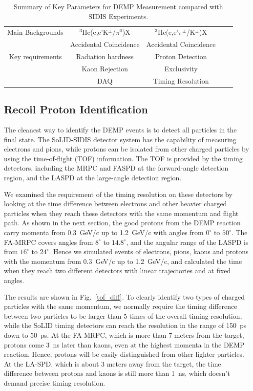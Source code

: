 \begin{table}
\begin{tabular}{|c|c|c|c|c|}
Main Backgrounds           & $\mathrm{^{3}He}$(e,e'K$^\pm$/$\pi^{0}$)X            &$\mathrm{^{3}He}$(e,e'$\pi^{\pm}$/K$^\pm$)X  \\
                           &   Accidental Coincidence & Accidental Coincidence	\\\hline
Key requirements           &  Radiation hardness      & Proton Detection	\\
                           &  Kaon Rejection          & Exclusivity	\\
                           &  DAQ                     &    Timing Resolution   \\
                        \hline
\end{tabular}
\caption{\footnotesize{Summary of Key Parameters for DEMP Measurement compared
    with SIDIS Experiments.}}\label{table:program_summary}
\label{table:key_par_sidis_dvcs}
\end{table} 

\subsection{Recoil Proton Identification}
The cleanest way to identify the DEMP events is to detect all particles in the
final state. The SoLID-SIDIS detector system has the capability of measuring
electrons and pions, while protons can be isolated from other charged particles
by using the time-of-flight (TOF) information. The TOF is provided by the timing
detectors, including the MRPC and FASPD at the forward-angle detection region,
and the LASPD at the large-angle detection region. 

We examined the requirement of the timing resolution on these detectors by
looking at the time difference between electrons and other heavier charged
particles when they reach these detectors with the same momentum and flight
path. As shown in the next section, the good protons from the DEMP reaction
carry momenta from 0.3~GeV/c up to 1.2~GeV/c with angles from
$0^{\circ}$ to $50^{\circ}$. The FA-MRPC covers angles from
$8^{\circ}$ to $14.8^{\circ}$, and the angular range of the LASPD is from
$16^{\circ}$ to $24^{\circ}$.  Hence we simulated
events of electrons, pions, kaons and protons with the momentum from
0.3~GeV/c up to 1.2~GeV/c, and calculated the time when they reach two different
detectors with linear trajectories and at fixed angles.

The results are shown in Fig.~\ref{tof_diff}. To clearly identify two types of
charged particles with the same momentum, we normally require the timing
difference between two particles to be larger than 5 times of the overall
timing resolution, while the SoLID timing detectors can reach the resolution
in the range of 150~ps down to 50~ps.  At the FA-MRPC, which is more than 7
meters from the target, protons come 3~ns later than kaons, even at the
highest momenta in the DEMP reaction. Hence, protons will be easily distinguished
from other lighter particles.  At the LA-SPD, which is about 3 meters away from
the target, the time difference between protons and kaons is still more than
1~ns, which doesn't demand precise timing resolution.


